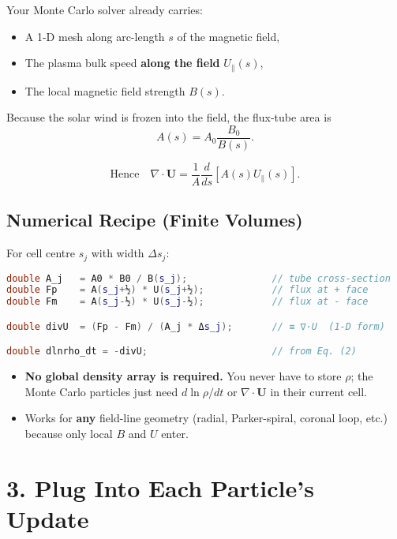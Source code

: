 Your Monte Carlo solver already carries:
\begin{itemize}
    \item A 1-D mesh along arc-length $s$ of the magnetic field,
    \item The plasma bulk speed \textbf{along the field} $U_\parallel(s)$,
    \item The local magnetic field strength $B(s)$.
\end{itemize}

Because the solar wind is frozen into the field, the flux-tube area is
\[
A(s) = A_0 \frac{B_0}{B(s)}.
\]

\begin{center}
\[
\text{Hence} \quad
\boxed{\displaystyle
\nabla \cdot \mathbf{U}
= \frac{1}{A} \frac{d}{ds} \left[ A(s) U_\parallel(s) \right].
}
\]
\end{center}

\hrulefill

\subsection*{Numerical Recipe (Finite Volumes)}

For cell centre $s_j$ with width $\Delta s_j$:

\begin{lstlisting}[language=C++, basicstyle=\ttfamily\small]
double A_j   = A0 * B0 / B(s_j);               // tube cross-section
double Fp    = A(s_j+½) * U(s_j+½);            // flux at + face
double Fm    = A(s_j-½) * U(s_j-½);            // flux at - face

double divU  = (Fp - Fm) / (A_j * Δs_j);       // ≡ ∇·U  (1-D form)

double dlnrho_dt = -divU;                      // from Eq. (2)
\end{lstlisting}

\begin{itemize}
    \item \textbf{No global density array is required.} You never have to store $\rho$; the Monte Carlo particles just need $d\ln\rho/dt$ or $\nabla \cdot \mathbf{U}$ in their current cell.
    \item Works for \textbf{any} field-line geometry (radial, Parker-spiral, coronal loop, etc.) because only local $B$ and $U$ enter.
\end{itemize}

\hrulefill

\section*{3. Plug Into Each Particle’s Update}

